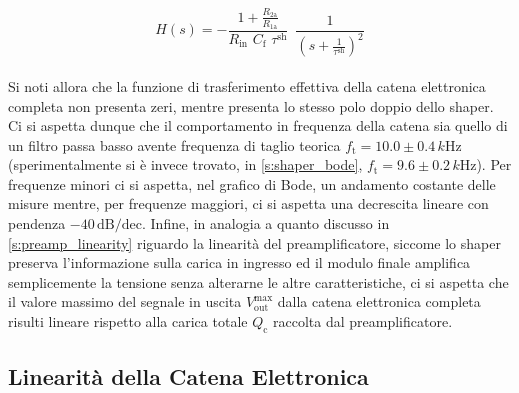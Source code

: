 \documentclass[a4paper,11pt]{article} %
\begin{document}
\begin{equation}\label{e:catena_H_final} 
	H(s) = -\frac{ 1 + \frac{R_{2\text{a}}}{R_{1\text{a}}} }{ R_{\text{in}}
	\,\, C_{\text{f}} \,\, \tau^{ \text{sh} } } 
	\,\,\, \frac{1}{\left( s + \frac{ 1 }{ \tau^{ \text{sh} } } \right)^2}
\end{equation}\\
Si noti allora che la funzione di trasferimento effettiva della catena elettronica completa non presenta zeri, mentre
presenta lo stesso polo doppio dello shaper. Ci si aspetta dunque che il comportamento in frequenza della
catena sia quello di un filtro passa basso avente frequenza di taglio teorica $f_{\text{t}} = 10.0 \pm 0.4 \,\si{k\Hz}$
(sperimentalmente si è invece trovato, in \autoref{s:shaper_bode}, $f_{\text{t}} = 9.6 \pm 0.2 \,\si{k\Hz}$). Per
frequenze minori ci si aspetta, nel grafico di Bode, un andamento costante delle misure mentre, per frequenze maggiori,
ci si aspetta una decrescita lineare con pendenza $-40\,\text{dB/dec}$. Infine, in analogia a quanto discusso in
\autoref{s:preamp_linearity} riguardo la linearità del preamplificatore, siccome lo shaper preserva l'informazione sulla
carica in ingresso ed il modulo finale amplifica semplicemente la tensione senza alterarne le altre caratteristiche, ci
si aspetta che il valore massimo del segnale in uscita $V_{\text{out}}^{\text{max}}$ dalla catena elettronica completa
risulti lineare rispetto alla carica totale $Q_{\text{c}}$ raccolta dal preamplificatore.


\subsection{Linearità della Catena Elettronica}\label{s:catena_linearity}
\end{document}
